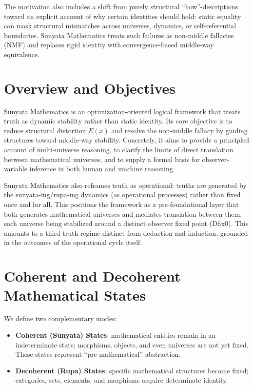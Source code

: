 \documentclass[11pt]{article}
\begin{document}
The motivation also includes a shift from purely structural ``how''-descriptions toward an explicit account of
why certain identities should hold: static equality can mask structural mismatches across universes, dynamics,
or self-referential boundaries. Sunyata Mathematics treats such failures as non-middle fallacies (NMF) and
replaces rigid identity with convergence-based middle-way equivalence.

\section{Overview and Objectives}
Sunyata Mathematics is an optimization-oriented logical framework that treats truth as dynamic stability rather than static identity.
Its core objective is to reduce structural distortion $E(x)$ and resolve the non-middle fallacy by guiding structures toward middle-way stability.
Concretely, it aims to provide a principled account of multi-universe reasoning, to clarify the limits of direct translation between mathematical
universes, and to supply a formal basis for observer-variable inference in both human and machine reasoning.

Sunyata Mathematics also reframes truth as operational: truths are generated by the sunyata-ing/rupa-ing dynamics (as operational processes) rather than fixed once and for all.
This positions the framework as a pre-foundational layer that both generates mathematical universes and mediates translation between them,
each universe being stabilized around a distinct observer fixed point (Dfix0).
This amounts to a third truth regime distinct from deduction and induction, grounded in the outcomes of the operational cycle itself.

\section{Coherent and Decoherent Mathematical States}
We define two complementary modes:

\begin{itemize}
    \item \textbf{Coherent (Sunyata) States}: mathematical entities remain in an indeterminate state;
    morphisms, objects, and even universes are not yet fixed. These states represent ``pre-mathematical''
    abstraction.
    \item \textbf{Decoherent (Rupa) States}: specific mathematical structures become fixed;
    categories, sets, elements, and morphisms acquire determinate identity.
\end{itemize}
\end{document}
